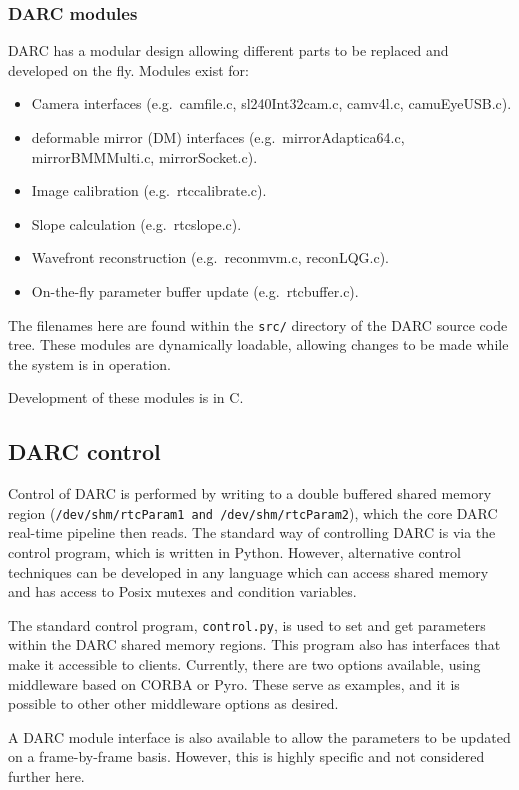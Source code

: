 \documentclass[a4,10pt]{article}
\newcommand{\dm}{deformable mirror (DM)\renewcommand{\dm}{DM\xspace}\xspace}
\begin{document}
\subsubsection{DARC modules}
DARC has a modular design allowing different parts to be replaced and
developed on the fly.  Modules exist for:
\begin{itemize}
\item Camera interfaces (e.g.\ camfile.c, sl240Int32cam.c, camv4l.c,
  camuEyeUSB.c).
\item \dm interfaces (e.g.\ mirrorAdaptica64.c, mirrorBMMMulti.c,
  mirrorSocket.c).
\item Image calibration (e.g.\ rtccalibrate.c).
\item Slope calculation (e.g.\ rtcslope.c).
\item Wavefront reconstruction (e.g.\ reconmvm.c, reconLQG.c).
\item On-the-fly parameter buffer update (e.g.\ rtcbuffer.c).
\end{itemize}
The filenames here are found within the {\tt src/} directory of the
DARC source code tree.  These modules are dynamically loadable,
allowing changes to be made while the system is in operation.

Development of these modules is in C.

\subsection{DARC control}
Control of DARC is performed by writing to a double buffered shared
memory region ({\tt /dev/shm/rtcParam1 and /dev/shm/rtcParam2}), which
the core DARC real-time pipeline then reads.  The standard way of
controlling DARC is via the control program, which is written in
Python.  However, alternative control techniques can be developed in
any language which can access shared memory and has access to Posix
mutexes and condition variables.

The standard control program, {\tt control.py}, is used to set and get
parameters within the DARC shared memory regions.  This program also
has interfaces that make it accessible to clients.  Currently, there
are two options available, using middleware based on CORBA or Pyro.
These serve as examples, and it is possible to other other middleware
options as desired.

A DARC module interface is also available to allow the parameters to
be updated on a frame-by-frame basis.  However, this is highly
specific and not considered further here.
\end{document}
